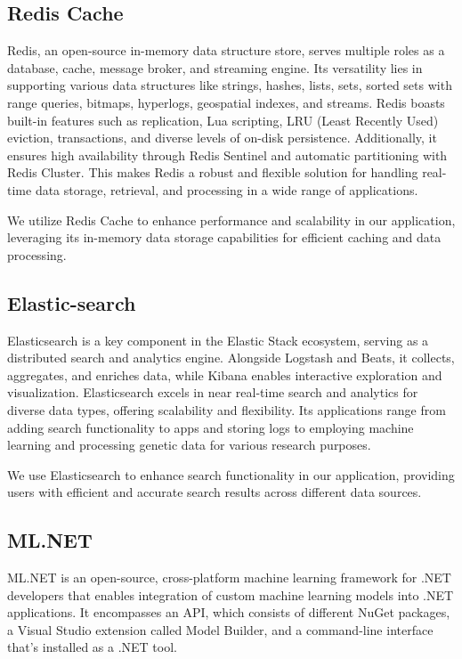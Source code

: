 \subsection{Redis Cache}

Redis, an open-source in-memory data structure store, serves multiple
roles as a database, cache, message broker, and streaming engine. Its
versatility lies in supporting various data structures like strings,
hashes, lists, sets, sorted sets with range queries, bitmaps, hyperlogs,
geospatial indexes, and streams. Redis boasts built-in features such as
replication, Lua scripting, LRU (Least Recently Used) eviction,
transactions, and diverse levels of on-disk persistence. Additionally,
it ensures high availability through Redis Sentinel and automatic
partitioning with Redis Cluster. This makes Redis a robust and flexible
solution for handling real-time data storage, retrieval, and processing
in a wide range of applications.

We utilize Redis Cache to enhance performance and scalability in our
application, leveraging its in-memory data storage capabilities for
efficient caching and data processing.


\subsection{Elastic-search}

Elasticsearch is a key component in the Elastic Stack ecosystem, serving
as a distributed search and analytics engine. Alongside Logstash and
Beats, it collects, aggregates, and enriches data, while Kibana enables
interactive exploration and visualization. Elasticsearch excels in near
real-time search and analytics for diverse data types, offering
scalability and flexibility. Its applications range from adding search
functionality to apps and storing logs to employing machine learning and
processing genetic data for various research purposes.

We use Elasticsearch to enhance search functionality in our application,
providing users with efficient and accurate search results across
different data sources.

\subsection{ML.NET}
ML.NET is an open-source, cross-platform machine learning framework for .NET 
developers that enables integration of custom machine learning models into .NET 
applications. It encompasses an API, which consists of different NuGet packages, 
a Visual Studio extension called Model Builder, and a command-line interface that's 
installed as a .NET tool.

